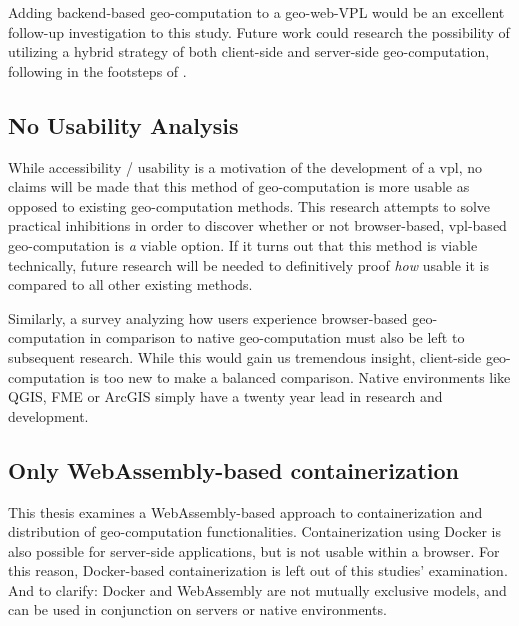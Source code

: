 Adding backend-based geo-computation to a geo-web-VPL would be an excellent follow-up investigation to this study. 
Future work could research the possibility of utilizing a hybrid strategy of both client-side and server-side geo-computation, following in the footsteps of \cite{panidi_hybrid_2015}. 

\subsection*{No Usability Analysis} %
While accessibility / usability is a motivation of the development of a \ac{vpl}, no claims will be made that this method of geo-computation is more usable as opposed to existing geo-computation methods. This research attempts to solve practical inhibitions in order to discover whether or not browser-based, vpl-based geo-computation is \emph{a} viable option. If it turns out that this method is viable technically, future research will be needed to definitively proof \emph{how} usable it is compared to all other existing methods.  


Similarly, a survey analyzing how users experience browser-based geo-computation in comparison to native geo-computation must also be left to subsequent research. While this would gain us tremendous insight, client-side geo-computation is too new to make a balanced comparison. Native environments like QGIS, FME or ArcGIS simply have a twenty year lead in research and development. 


\subsection*{Only WebAssembly-based containerization}
This thesis examines a WebAssembly-based approach to containerization and distribution of geo-computation functionalities. 
Containerization using Docker is also possible for server-side applications, but is not usable within a browser. 
For this reason, Docker-based containerization is left out of this studies' examination. 
And to clarify: Docker and WebAssembly are not mutually exclusive models, and can be used in conjunction on servers or native environments. 

